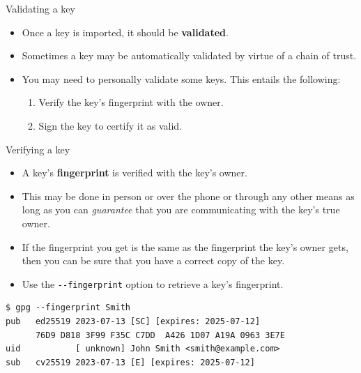 \documentclass[
mode=present,
paper=smartboard,
size=20pt,
]{powerdot}
\newcommand\vsp{\vspace{-16mm}}
\newcommand{\clopt}[1]{\texttt{{-}#1}}
\begin{document}
\begin{slide}{Validating a key}
  \begin{itemize}
  \item Once a key is imported, it should be \textbf{validated}.
  \item Sometimes a key may be automatically validated by virtue of a
    chain of trust.
  \item You may need to personally validate some keys.  This entails
    the following:
    \begin{enumerate}
    \item Verify the key's fingerprint with the owner.
    \item Sign the key to certify it as valid.
    \end{enumerate}
  \end{itemize}
\end{slide}

\begin{slide}[method=direct]{Verifying a key}
  \begin{itemize}
  \item A key's \textbf{fingerprint} is verified with the key's owner.
  \item This may be done in person or over the phone or through any
    other means as long as you can \emph{guarantee} that you are
    communicating with the key's true owner.
  \item If the fingerprint you get is the same as the fingerprint the
    key's owner gets, then you can be sure that you have a correct
    copy of the key.
  \item Use the \clopt{-fingerprint} option to retrieve a key's
    fingerprint.
  \end{itemize}
\vsp
\begin{verbatim}
$ gpg --fingerprint Smith
pub   ed25519 2023-07-13 [SC] [expires: 2025-07-12]
      76D9 D818 3F99 F35C C7DD  A426 1D07 A19A 0963 3E7E
uid           [ unknown] John Smith <smith@example.com>
sub   cv25519 2023-07-13 [E] [expires: 2025-07-12]
\end{verbatim}
\end{slide}
\end{document}
